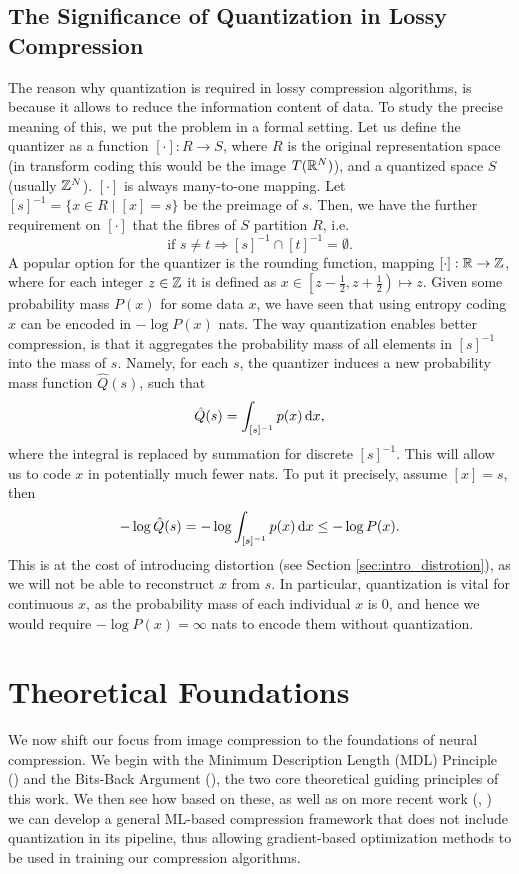 \subsection{The Significance of Quantization in Lossy Compression}
\par
The reason why quantization is required in lossy compression algorithms, is
because it allows to reduce the information content of data. To study the
precise meaning of this, we put the problem in a formal setting.
Let us define the quantizer as a function $[\cdot]: R \rightarrow S$, where
$R$ is the original representation space (in transform coding this would be the
image $T(\mathbb{R}^N)$), and a quantized space $S$ (usually $\mathbb{Z}^N$). $[\cdot]$
is always many-to-one mapping. Let $[s]^{-1} = \{x \in R \mid [x] = s \}$ be
the preimage of $s$. Then, we have the further requirement on $[\cdot]$ 
that the fibres of $S$ partition $R$, i.e.
\[
  \text{if } s \neq t \Rightarrow [s]^{-1} \cap [t]^{-1} = \emptyset.
\]
A popular option for the quantizer is the rounding function, mapping $[\cdot]: \mathbb{R}
\rightarrow \mathbb{Z}$, where for each integer $z \in \mathbb{Z}$ it is defined as $x
\in \left[z - \frac12, z + \frac12\right) \mapsto z$. Given some probability mass $P(x)$ 
for some data $x$, we have seen that using entropy coding $x$ can be encoded in
$-\log P(x)$ nats. The way quantization enables better compression, is that it
aggregates the probability mass of all elements in $[s]^{-1}$ into the mass of $s$.
Namely, for each $s$, the quantizer induces a new probability mass function
$\hat{Q}(s)$, such that
\[
  \hat{Q}(s) = \int_{[s]^{-1}} p(x) \,\text{d} x,
\]
where the integral is replaced by summation for discrete $[s]^{-1}$. This will allow
us to code $x$ in potentially much fewer nats. To put it precisely, assume $[x] =
s$, then
\[
  -\log \hat{Q}(s) = -\log \int_{[s]^{-1}} p(x) \,\text{d} x \leq -\log P(x).
\]
This is at the cost of introducing distortion (see Section
\ref{sec:intro_distrotion}), as we will not be able to reconstruct $x$ from $s$.
In particular, quantization is vital for continuous $x$, as the probability mass of each
individual $x$ is 0, and hence we would require $-\log P(x) = \infty$ nats to
encode them without quantization.

\section{Theoretical Foundations}
\label{sec:intro_theoretical_foundations}
\par
We now shift our focus from image compression to the foundations of
neural compression. We begin with the Minimum Description Length (MDL)
Principle (\cite{rissanen1986stochastic}) and the Bits-Back Argument
(\cite{hinton1993keeping}), the two core theoretical guiding
principles of this work. We then see how based on these, as well as on
more recent work (\cite{harsha2007communication}, \cite{havasi2018minimal})
we can develop a general ML-based compression framework that does not include
quantization in its pipeline, thus allowing gradient-based optimization methods
to be used in training our compression algorithms.

